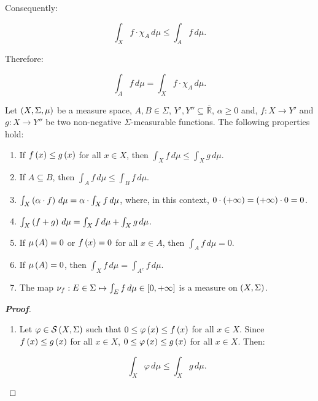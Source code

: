 \begin{remark}
  Consequently:

  \begin{equation}
    \int_{X}{f\cdot\chi_A\,d\mu}\leq\int_{A}{f\,d\mu}.
  \end{equation}

  Therefore:

  \begin{equation}
    \int_{A}{f\,d\mu}=\int_{X}{f\cdot\chi_A\,d\mu}.
  \end{equation}
\end{remark}

\begin{proposition}
  Let $\left(X,\Sigma,\mu\right)$ be a measure space, $A,B\in\Sigma$, $Y',Y''\subseteq\overline{\mathbb{R}}$, $\alpha\geq 0$ and, $f:X\rightarrow Y'$ and $g:X\rightarrow Y''$ be two non-negative $\Sigma$-measurable functions. The following properties hold:

  \begin{enumerate}
      \item If $f\left(x\right)\leq g\left(x\right)$ for all $x\in X$, then $\int_{X}{f\,d\mu}\leq\int_{X}{g\,d\mu}$.
      \item If $A\subseteq B$, then $\int_{A}{f\,d\mu}\leq\int_{B}{f\,d\mu}$.
      \item $\int_{X}{\left(\alpha\cdot f\right)\,d\mu}=\alpha\cdot\int_{X}{f\,d\mu}$, where, in this context, $0\cdot\left(+\infty\right)=\left(+\infty\right)\cdot 0=0$.
      \item $\int_{X}{\left(f+g\right)\,d\mu}=\int_{X}{f\,d\mu}+\int_{X}{g\,d\mu}$.
      \item If $\mu\left(A\right)=0$ or $f\left(x\right)=0$ for all $x\in A$, then $\int_{A}{f\,d\mu}=0$.
      \item If $\mu\left(A\right)=0$, then $\int_{X}{f\,d\mu}=\int_{A^c}{f\,d\mu}$.
      \item The map $\nu_f:E\in\Sigma\mapsto\int_{E}{f\,d\mu}\in\left[0,+\infty\right]$ is a measure on $\left(X,\Sigma\right)$.
  \end{enumerate}
  \begin{proof}[\rm\textbf{Proof}]
    \hfill
    \begin{enumerate}
      \item Let $\varphi\in\mathcal{S}\left(X,\Sigma\right)$ such that $0\leq\varphi\left(x\right)\leq f\left(x\right)$ for all $x\in X$. Since $f\left(x\right)\leq g\left(x\right)$ for all $x\in X$, $0\leq\varphi\left(x\right)\leq g\left(x\right)$ for all $x\in X$. Then:
      
      \begin{equation}
        \int_{X}{\varphi\,d\mu}\leq\int_{X}{g\,d\mu}.
      \end{equation}


\end{enumerate}
\end{proof}
\end{proposition}
